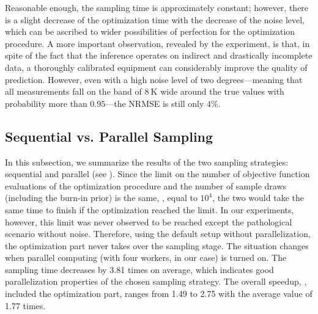 Reasonable enough, the sampling time is approximately constant; however, there is a slight decrease of the optimization time with the decrease of the noise level, which can be ascribed to wider possibilities of perfection for the optimization procedure.
A more important observation, revealed by the experiment, is that, in spite of the fact that the inference operates on indirect and drastically incomplete data, a thoroughly calibrated equipment can considerably improve the quality of prediction. However, even with a high noise level of two degrees---meaning that all measurements fall on the band of $8~\text{K}$ wide around the true values with probability more than $0.95$---the NRMSE is still only $4\%$.

\subsection{Sequential vs. Parallel Sampling}
In this subsection, we summarize the results of the two sampling strategies: sequential and parallel (see ). Since the limit on the number of objective function evaluations of the optimization procedure and the number of sample draws (including the burn-in prior) is the same, \ie, equal to $10^4$, the two would take the same time to finish if the optimization reached the limit. In our experiments, however, this limit was never observed to be reached except the pathological scenario without noise. Therefore, using the default setup without parallelization, the optimization part never takes over the sampling stage. The situation changes when parallel computing (with four workers, in our case) is turned on. The sampling time decreases by 3.81 times on average, which indicates good parallelization properties of the chosen sampling strategy. The overall speedup, \ie, included the optimization part, ranges from 1.49 to 2.75 with the average value of 1.77 times.
